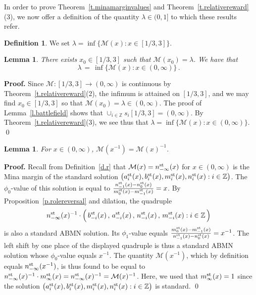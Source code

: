\documentclass[letterpaper,11pt,oneside,reqno]{amsbook}
\newcommand{\Z}{\ensuremath{\mathbb{Z}}}
\numberwithin{figure}{chapter}
\newtheorem{lemma}[theorem]{Lemma}
\theoremstyle{definition}
\theoremstyle{definition}
\theoremstyle{definition}
\newtheorem{definition}[theorem]{Definition}
\theoremstyle{definition}
\theoremstyle{definition}
\newcommand{\asta}{a^{\rm st}}
\newcommand{\bst}{b^{\rm st}}
\newcommand{\mst}{m^{\rm st}}
\newcommand{\nst}{n^{\rm st}}
\newcommand{\minamm}{\mathcal{M}}
\newcommand{\abmnmacspace}{\textrm{ABMN} }
\begin{document}
In order to prove Theorem~\ref{t.minamarginvalues} and Theorem~\ref{t.relativereward}(3), we now offer a definition of the quantity $\lambda \in (0,1]$ to which these results refer.
\begin{definition}\label{D.lambda}
We set $\lambda = \inf \{ \minamm(x): x \in [1/3,3] \}$.
\end{definition}
\begin{lemma}\label{l.infimumminamarginmap}
There exists $x_0 \in [1/3,3]$ such that $\minamm(x_0) = \lambda$. We have that 
$$
\lambda \, = \,  \inf \{ \minamm(x): x \in (0,\infty) \} \, .
$$
\end{lemma}
{\bf Proof.}
Since $\minamm:[1/3,3] \to (0,\infty)$ is continuous by Theorem~\ref{t.relativereward}(2), the infimum is attained on $[1/3,3]$, and we may find $x_0 \in [1/3,3]$ so that $\minamm(x_0) = \lambda \in (0,\infty)$.
The proof of Lemma~\ref{l.battlefield} shows that $\cup_{i \in \Z} s_i[1/3,3] = (0,\infty)$. 
By Theorem~\ref{t.relativereward}(3),  we see thus that  $\lambda = \inf \{ \minamm(x): x \in (0,\infty) \}$. \qed
\begin{lemma}\label{l.rangeminamarginmap}
For $x \in (0,\infty)$, $\minamm(x^{-1}) = \minamm(x)^{-1}$. 
\end{lemma}
{\bf Proof.} Recall from Definition~\ref{d.r} that $\minamm(x) =\nst_{-\infty}(x)$ for  $x \in (0,\infty)$ is 
the Mina margin of the standard solution $\big(\asta_i(x),\bst_i(x),\mst_i(x),\nst_i(x): i \in \Z \big)$. The $\phi_0$-value of this solution is equal to  $\tfrac{\nst_{-1}(x) - \nst_0(x)}{\mst_0(x) - \mst_{-1}(x)} = x$. 
By Proposition~\ref{p.rolereversal} and dilation, the quadruple  
$$
 \nst_{-\infty}(x)^{-1} \cdot  \Big( \, \bst_{-i}(x) \, , \, \asta_{-i}(x) \, , \,
 \nst_{-i}(x) \, , \, \mst_{-i}(x): i \in \Z \, \Big)
$$ 
is also a standard \abmnmacspace solution. Its $\phi_1$-value equals  $\tfrac{\mst_0(x) - \mst_{-1}(x)}{\nst_{-1}(x) - \nst_0(x)}  = x^{-1}$.
The left shift by one place of the displayed quadruple is thus a standard \abmnmacspace solution whose $\phi_0$-value equals $x^{-1}.$
The quantity $\minamm(x^{-1})$, which by definition equals $\nst_{-\infty}(x^{-1})$, is thus found to be equal to 
$\nst_{-\infty}(x)^{-1} \cdot  \mst_\infty(x) =\nst_{-\infty}(x)^{-1} = \minamm(x)^{-1}$. Here, we used that  $\mst_\infty(x) = 1$ since the solution $\big(\asta_i(x),\bst_i(x),\mst_i(x),\nst_i(x): i \in \Z \big)$ is standard.
\qed 
\end{document}
